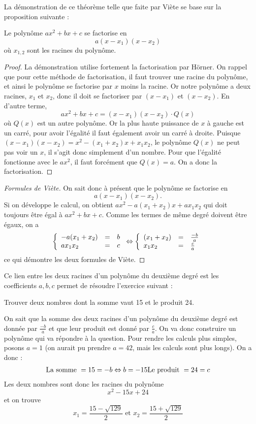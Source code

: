 La démonstration de ce théorème telle que faite par Viète se base sur la proposition suivante :

\begin{proposition}
Le polynôme $ax^2 +bx+c$ se factorise en 
$$
a(x-x_1)(x-x_2)
$$
où $x_{1,2}$ sont les racines du polynôme.
\end{proposition}

\begin{proof}
La démonstration utilise fortement la factorisation par Hörner. On rappel que pour cette méthode de factorisation, il faut trouver une racine du polynôme, et ainsi le polynôme se factorise par $x$ moins la racine. Or notre polynôme a deux racines, $x_1$ et $x_2$, donc il doit se factoriser par $(x-x_1)$ et $(x-x_2)$. En d'autre terme, 
$$
ax^2 + bx + c = (x-x_1)(x-x_2) \cdot Q(x)
$$
où $Q(x)$ est un autre polynôme. Or la plus haute puissance de $x$ à gauche est un carré, pour avoir l'égalité il faut également avoir un carré à droite. Puisque $(x-x_1)(x-x_2)= x^2 -(x_1+x_2)x + x_1 x_2$, le polynôme $Q(x)$ ne peut pas voir un $x$, il s'agit donc simplement d'un nombre. Pour que l'égalité fonctionne avec le $ax^2$, il faut forcément que $Q(x) = a$. On a donc la factorisation.
\end{proof}

\begin{proof}[Formules de Viète]
On sait donc à présent que le polynôme se factorise en 
$$
a(x-x_1)(x-x_2).
$$
Si on développe le calcul, on obtient $ax^2 -a(x_1+x_2)x + a x_1 x_2$ qui doit toujours être égal à $ax^2 + bx + c$. Comme les termes de même degré doivent être égaux, on a 
$$
\left\{ 
\begin{array}{lcl}
-a(x_1+x_2) &=& b\\
a x_1 x_2 &=& c
\end{array}
\right.
\Leftrightarrow 
\left\{ 
\begin{array}{lcl}
(x_1+x_2) &=& \frac{-b}{a}\\
x_1 x_2 &=& \frac{c}{a}
\end{array}
\right.
$$
ce qui démontre les deux formules de Viète.
\end{proof}

Ce lien entre les deux racines d'un polynôme du deuxième degré est les coefficients $a,b,c$ permet de résoudre l'exercice suivant :

\begin{exercice}
Trouver deux nombres dont la somme vaut 15 et le produit 24.

On sait que la somme des deux racines d'un polynôme du deuxième degré est donnée par $\frac{-b}{a}$ et que leur produit est donné par $\frac{c}{a}$. On va donc construire un polynôme qui va répondre à la question. Pour rendre les calculs plus simples, posons $a=1$ (on aurait pu prendre $a=42$, mais les calculs sont plus longs). On a donc :
$$
\begin{array}{ll}
\mbox{La somme } = 15 = -b \Leftrightarrow b=-15
\mbox{Le produit } = 24 = c
\end{array}
$$
Les deux nombres sont donc les racines du polynôme 
$$
x^2 -15x+24
$$
et on trouve 
$$
x_1 = \frac{15-\sqrt{129}}{2} \mbox{ et } x_2 = \frac{15+\sqrt{129}}{2} 
$$
\end{exercice}

